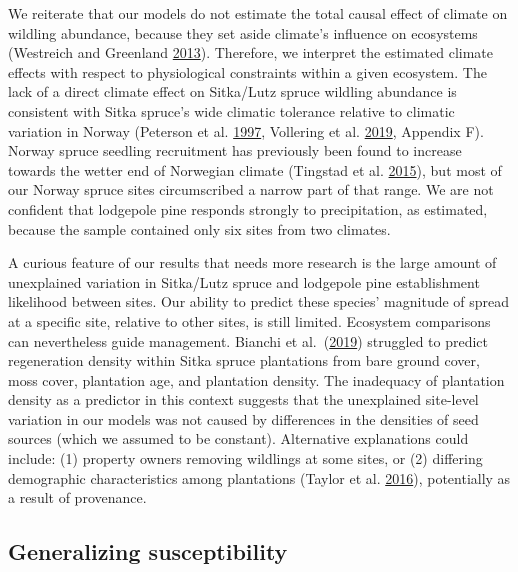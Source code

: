 \documentclass[
]{article}
\begin{document}
We reiterate that our models do not estimate the total causal effect of climate on wildling abundance, because they set aside climate's influence on ecosystems (Westreich and Greenland \protect\hyperlink{ref-westreichTableFallacyPresenting2013}{2013}).
Therefore, we interpret the estimated climate effects with respect to physiological constraints within a given ecosystem.
The lack of a direct climate effect on Sitka/Lutz spruce wildling abundance is consistent with Sitka spruce's wide climatic tolerance relative to climatic variation in Norway (Peterson et al. \protect\hyperlink{ref-petersonEcologyManagementSitka1997}{1997}, Vollering et al. \protect\hyperlink{ref-volleringBunchingBackgroundBetters2019}{2019}, Appendix F).
Norway spruce seedling recruitment has previously been found to increase towards the wetter end of Norwegian climate (Tingstad et al. \protect\hyperlink{ref-tingstadTemperaturePrecipitationBiotic2015}{2015}), but most of our Norway spruce sites circumscribed a narrow part of that range.
We are not confident that lodgepole pine responds strongly to precipitation, as estimated, because the sample contained only six sites from two climates.

A curious feature of our results that needs more research is the large amount of unexplained variation in Sitka/Lutz spruce and lodgepole pine establishment likelihood between sites.
Our ability to predict these species' magnitude of spread at a specific site, relative to other sites, is still limited.
Ecosystem comparisons can nevertheless guide management.
Bianchi et al.~(\protect\hyperlink{ref-bianchiMethodsPredictingSitka2019}{2019}) struggled to predict regeneration density within Sitka spruce plantations from bare ground cover, moss cover, plantation age, and plantation density.
The inadequacy of plantation density as a predictor in this context suggests that the unexplained site-level variation in our models was not caused by differences in the densities of seed sources (which we assumed to be constant).
Alternative explanations could include: (1) property owners removing wildlings at some sites, or (2) differing demographic characteristics among plantations (Taylor et al. \protect\hyperlink{ref-taylorDriversPlantInvasion2016}{2016}), potentially as a result of provenance.

\hypertarget{generalizing-susceptibility}{%
\subsection{Generalizing susceptibility}\label{generalizing-susceptibility}}
\end{document}
